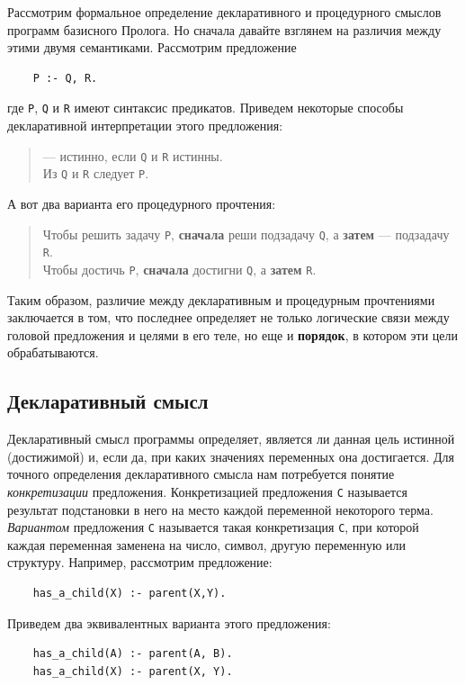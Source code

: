 \documentclass[12pt, openany, twoside]{book} %
\begin{document}
Рассмотрим формальное определение декларативного и процедурного смыслов программ базисного Пролога. Но сначала давайте взглянем на различия между этими двумя семантиками. Рассмотрим предложение
{\tt\begin{verbatim}
    Р :- Q, R.
\end{verbatim}}
\noindent где {\tt Р}, {\tt Q} и {\tt R} имеют синтаксис предикатов. Приведем некоторые способы декларативной интерпретации этого предложения:
\begin{quote}
 --- истинно, если {\tt Q} и {\tt R} истинны. \\
Из {\tt Q} и {\tt R} следует {\tt Р}.
\end{quote}

\noindent А вот два варианта его процедурного прочтения:

\begin{quote}
\noindent Чтобы решить задачу {\tt Р}, \textbf{сначала} реши подзадачу {\tt Q}, а {\bf затем} --- подзадачу {\tt R}. \\
Чтобы достичь {\tt Р}, \textbf{сначала} достигни {\tt Q},
а \textbf{затем} {\tt R}.
\end{quote}

Таким образом, различие между декларативным и процедурным прочтениями заключается в том, что последнее определяет не только логические связи между головой предложения и целями в его теле, но еще и {\bf порядок}, в котором эти цели обрабатываются.

\subsection{Декларативный смысл}
Декларативный смысл программы определяет, является ли данная цель истинной (достижимой) и, если да, при каких значениях переменных она достигается. Для точного определения декларативного смысла нам потребуется понятие \emph{конкретизации} предложения. Конкретизацией предложения {\tt С} называется результат подстановки в него на место каждой переменной некоторого терма. \emph{Вариантом} предложения {\tt С} называется такая конкретизация {\tt С}, при которой каждая переменная заменена на число, символ, другую переменную или структуру. Например, рассмотрим предложение: %
{\tt\begin{verbatim}
    has_a_child(X) :- parent(X,Y).
\end{verbatim}}

\noindent Приведем два эквивалентных варианта этого предложения:
{\tt\begin{verbatim}
    has_a_child(А) :- parent(А, В).
    has_a_child(X) :- parent(X, Y).
\end{verbatim}}
\end{document}
